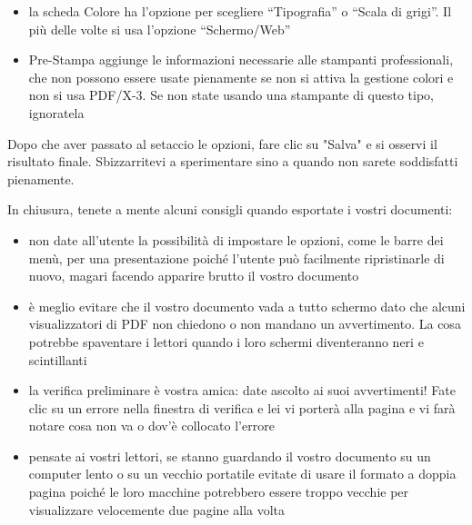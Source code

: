 \documentclass[a4paper, 12pt]{book}
\begin{document}
\begin{itemize}
	\item la scheda Colore ha l'opzione per scegliere “Tipografia” o “Scala di grigi”. Il più delle volte si usa l'opzione “Schermo/Web”

	\item Pre-Stampa aggiunge le informazioni necessarie alle stampanti professionali, che non possono essere usate pienamente se non si attiva la gestione colori e non si usa PDF/X-3. Se non state usando una stampante di questo tipo, ignoratela

\end{itemize}

Dopo che aver passato al setaccio le opzioni, fare clic su "Salva" e si osservi il risultato finale. Sbizzarritevi a sperimentare sino a quando non sarete soddisfatti pienamente.

In chiusura, tenete a mente alcuni consigli quando esportate i vostri documenti: 

\begin{itemize}
	\item non date all'utente la possibilità di impostare le opzioni, come le barre dei menù, per una presentazione poiché l'utente può facilmente ripristinarle di nuovo, magari facendo apparire brutto il vostro documento

	\item è meglio evitare che il vostro documento vada a tutto schermo dato che alcuni visualizzatori di PDF non chiedono o non mandano un avvertimento. La cosa potrebbe spaventare i lettori quando i loro schermi diventeranno neri e scintillanti

	\item la verifica preliminare è vostra amica: date ascolto ai suoi avvertimenti! Fate clic su un errore nella finestra di verifica e lei vi porterà alla pagina e vi farà notare cosa non va o dov'è collocato l'errore

	\item pensate ai vostri lettori, se stanno guardando il vostro documento su un computer lento o su un vecchio portatile evitate di usare il formato a doppia pagina poiché le loro macchine potrebbero essere troppo vecchie per visualizzare velocemente due pagine alla volta
\end{itemize}
\end{document}
